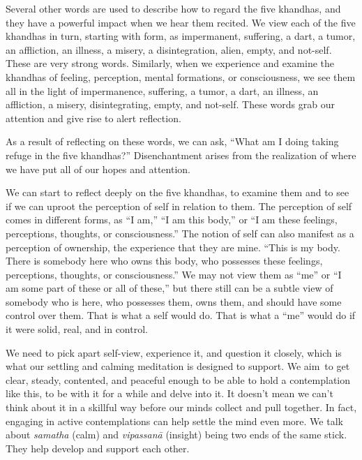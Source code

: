 Several other words are used to describe how to regard the five khandhas, and they have a powerful impact when we hear them recited. We view each of the five khandhas in turn, starting with form, as impermanent, suffering, a dart, a tumor, an affliction, an illness, a misery, a disintegration, alien, empty, and not-self. These are very strong words. Similarly, when we experience and examine the khandhas of feeling, perception, mental formations, or consciousness, we see them all in the light of impermanence, suffering, a tumor, a dart, an illness, an affliction, a misery, disintegrating, empty, and not-self. These words grab our attention and give rise to alert reflection.

As a result of reflecting on these words, we can ask, ``What am I doing taking refuge in the five khandhas?'' Disenchantment arises from the realization of where we have put all of our hopes and attention.

We can start to reflect deeply on the five khandhas, to examine them and to see if we can uproot the perception of self in relation to them. The perception of self comes in different forms, as ``I am,'' ``I am this body,'' or ``I am these feelings, perceptions, thoughts, or consciousness.'' The notion of self can also manifest as a perception of ownership, the experience that they are mine. ``This is my body. There is somebody here who owns this body, who possesses these feelings, perceptions, thoughts, or consciousness.'' We may not view them as ``me'' or ``I am some part of these or all of these,'' but there still can be a subtle view of somebody who is here, who possesses them, owns them, and should have some control over them. That is what a self would do. That is what a ``me'' would do if it were solid, real, and in control.

We need to pick apart self-view, experience it, \linebreak and question it closely, which is what our settling and \linebreak calming meditation is designed to support. We \mbox{aim to} get clear, steady, contented, and peaceful enough to be \linebreak able to hold a contemplation like this, to be with it for a while and delve into it. It doesn't mean we can't think about it in a skillful way before our minds collect and pull together. In fact, engaging in active contemplations can help settle the mind even more. We talk about \emph{samatha} (calm) and \emph{vipassanā} (insight) being two ends of the same stick. They help develop and support each other.

